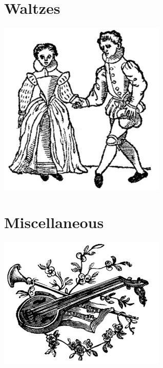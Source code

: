 \documentclass[12pt]{report}
\begin{document}
\chapter{Waltzes}
\begin{center}
\includegraphics[width=8cm]{../images/waltzes}
\end{center}



\chapter{Miscellaneous}
\begin{center}
\includegraphics[width=8cm]{../images/misc}
\end{center}
\end{document}
